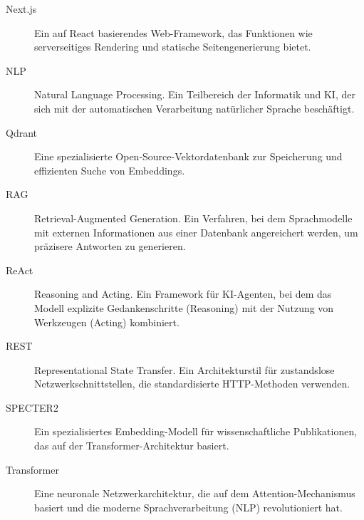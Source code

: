 \begin{description}
    \item[Next.js] Ein auf React basierendes Web-Framework, das Funktionen wie serverseitiges Rendering und statische Seitengenerierung bietet.
    \item[NLP] Natural Language Processing. Ein Teilbereich der Informatik und KI, der sich mit der automatischen Verarbeitung natürlicher Sprache beschäftigt.
    \item[Qdrant] Eine spezialisierte Open-Source-Vektordatenbank zur Speicherung und effizienten Suche von Embeddings.
    \item[RAG] Retrieval-Augmented Generation. Ein Verfahren, bei dem Sprachmodelle mit externen Informationen aus einer Datenbank angereichert werden, um präzisere Antworten zu generieren.
    \item[ReAct] Reasoning and Acting. Ein Framework für KI-Agenten, bei dem das Modell explizite Gedankenschritte (Reasoning) mit der Nutzung von Werkzeugen (Acting) kombiniert.
    \item[REST] Representational State Transfer. Ein Architekturstil für zustandslose Netzwerkschnittstellen, die standardisierte HTTP-Methoden verwenden.
    \item[SPECTER2] Ein spezialisiertes Embedding-Modell für wissenschaftliche Publikationen, das auf der Transformer-Architektur basiert.
    \item[Transformer] Eine neuronale Netzwerkarchitektur, die auf dem Attention-Mechanismus basiert und die moderne Sprachverarbeitung (NLP) revolutioniert hat.
\end{description}
